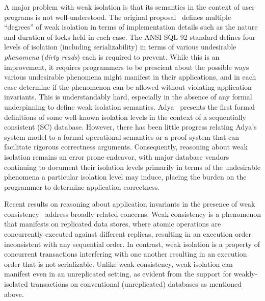 A major problem with weak isolation is that its semantics in the
context of user programs is not well-understood. The original
proposal~\cite{gray1976} defines multiple ``degrees'' of weak
isolation in terms of implementation details such as the nature and
duration of locks held in each case. The ANSI SQL 92 standard defines
four levels of isolation (including serializability) in terms of
various undesirable \emph{phenomena} (\eg \emph{dirty reads}) each is
required to prevent. While this is an improvement, it requires
programmers to be prescient about the possible ways various
undesirable phenomena might manifest in their applications, and in
each case determine if the phenomenon can be allowed without violating
application invariants. This is understandably hard, especially in the
absence of any formal underpinning to define weak isolation semantics.
Adya~\cite{adyaphd} presents the first formal definitions of some
well-known isolation levels in the context of a sequentially
consistent (SC) database.  However, there has been little progress
relating Adya's system model to a formal operational semantics or a
proof system that can facilitate rigorous correctness arguments.
Consequently, reasoning about weak isolation remains an error prone
endeavor, with major database vendors~\cite{postgresiso, mysqliso,
oracleiso} continuing to document their isolation levels primarily in
terms of the undesirable phenomena a particular isolation level may
induce, placing the burden on the programmer to determine application
correctness.

Recent results on reasoning about application invariants in the
presence of weak consistency~\cite{burckhardt14, redblueosdi,
redblueatc, ecinec, gotsmanpopl16} address broadly related concerns.
Weak consistency is a phenomenon that manifests on replicated data
stores, where atomic operations are concurrently executed against
different replicas, resulting in an execution order inconsistent with
any sequential order. In contrast, weak isolation is a property of
concurrent transactions interfering with one another resulting in an
execution order that is not serializable. Unlike weak consistency,
weak isolation can manifest even in an unreplicated setting, as
evident from the support for weakly-isolated transactions on
conventional (unreplicated) databases as mentioned above.


